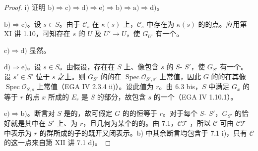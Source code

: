 \begin{proof}
i) 证明 $\mathrm{b)}\Rightarrow\mathrm{c)}\Rightarrow\mathrm{d)}\Rightarrow\mathrm{e)}\Rightarrow\mathrm{b)}\Rightarrow\mathrm{a)}\Rightarrow\mathrm{d)}$。

$\mathrm{b)}\Rightarrow\mathrm{c)}$。设 $s\in S$。由于 $\mathcal C_s$ 在 $\kappa(s)$ 上，$\mathcal C_s$ 中存在为 $\kappa(s)$ 的的点。应用第 XI 讲 1.10，可知存在 $s$ 的 $U$ 及 $U'\to U$，使 $G_{U'}$ 有一个。

$\mathrm{c)}\Rightarrow\mathrm{d)}$ 显然。

$\mathrm{d)}\Rightarrow\mathrm{e)}$。设 $s\in S$。由假设，存在在 $S$ 上、像包含 $s$ 的 $S$- $S'$，使 $G_{S'}$ 有一个。设 $s'\in S'$ 位于 $s$ 之上。则 $G_{S'}$ 的的在 $\operatorname{Spec}\mathcal O_{S',s'}$ 上常值，因此 $G$ 的的在其像 $\operatorname{Spec}\mathcal O_{S,s}$ 上常值（EGA IV 2.3.4 ii)）。设此值为 $r$。由 6.3 bis，$S$ 中满足 $G_x$ 的等于 $r$ 的点 $x$ 所成的 $E_r$ 是 $S$ 的部分，故包含 $s$ 的一个（EGA IV 1.10.1）。

$\mathrm{e)}\Rightarrow\mathrm{b)}$。断言对 $S$ 是的，故可假定 $G$ 的的恒等于 $r$。对于每个 $S$- $S'$，$G_{S'}$ 的恰好就是其中在 $S'$ 上、为 $r$，且几何为某个的的。由 7.1，$\mathcal{CT}$ ，所以 $\mathcal C$ 可由 $\mathcal{CT}$ 中表示为 $r$ 的群所成的子的既开又闭表示。b) 中其余断言均包含于 7.1 i)，只有 $\mathcal C$ 的这一点来自第 XII 讲 7.1 d)。


\end{proof}
